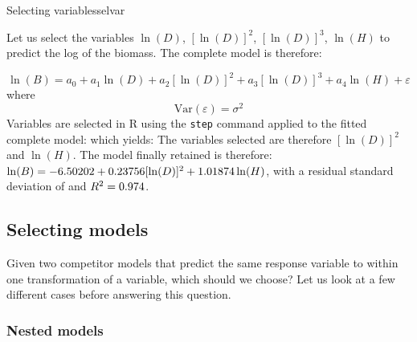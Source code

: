 \begin{filrouge}{Selecting variables}{selvar}

Let us select the variables $\ln(D)$, $[\ln(D)]^2$, $[\ln(D)]^3$, $\ln(H)$ to predict the log of the biomass. The complete model is therefore:

\[
\ln(B)=a_0+a_1\ln(D)+a_2[\ln(D)]^2+a_3[\ln(D)]^3+a_4\ln(H)
+\varepsilon
\]
where
\[
\mathrm{Var}(\varepsilon)=\sigma^2
\]
Variables are selected in R using the \texttt{step} command applied to the fitted complete model:
%
which yields:
%
The variables selected are therefore  $[\ln(D)]^2$ and $\ln(H)$. The model finally retained is therefore:
$\ln(B)=-\mbox{6.50202}+\mbox{0.23756}[\ln(D)]^2+\mbox{1.01874}\ln(H)$,
with a residual standard deviation of  and
$R^2=\mbox{0.974}$.
\end{filrouge}

\subsection{Selecting models\label{selmod}}

Given two competitor models that predict the same response variable to within one transformation of a variable, which should we choose? Let us look at a few different cases before answering this question.

\subsubsection{Nested models}

